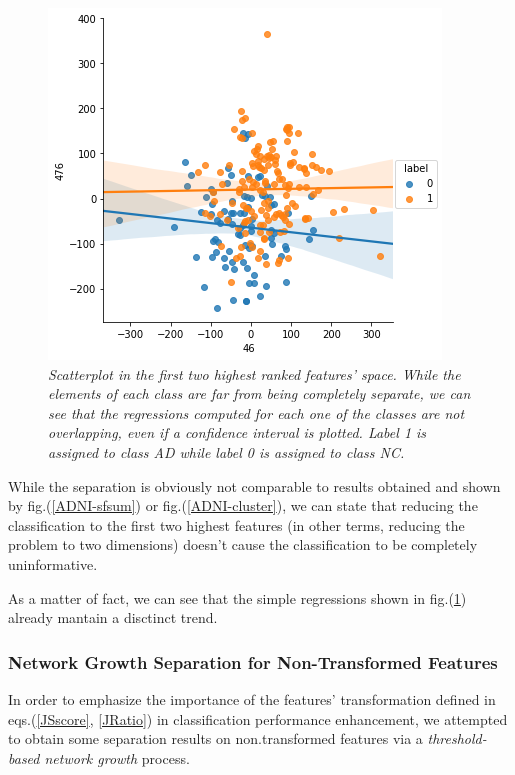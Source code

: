 \documentclass[12pt,openright,twoside,a4paper]{book}
\begin{document}
\begin{figure}[!h]
\centering
\includegraphics[scale=0.7]{first-feat-sep}
\caption{\textit{Scatterplot in the first two highest ranked features' space. While  the elements of each class are far from being completely separate, we can see that the regressions computed for each one of the classes are not overlapping, even if a confidence interval is plotted. Label 1 is assigned to class AD while label 0 is assigned to class NC. }}
\label{ADNI-fsep}
\end{figure}

While the separation is obviously not comparable to results obtained and shown by fig.(\ref{ADNI-sfsum}) or fig.(\ref{ADNI-cluster}), we can state that reducing the classification to the first two highest features (in other terms, reducing the problem to two dimensions) doesn't cause the classification to be completely uninformative.

As a matter of fact, we can see that the simple regressions shown in fig.(\ref{ADNI-fsep}) already mantain a disctinct trend.

\subsubsection*{Network Growth Separation for Non-Transformed Features}

In order to emphasize the importance of the features' transformation defined in eqs.(\ref{JSscore}, \ref{JRatio}) in classification performance enhancement, we attempted to obtain some separation results on non.transformed features via a \textit{threshold-based network growth} process.
\vspace{5mm}
\end{document}
